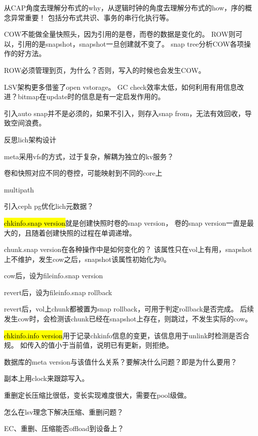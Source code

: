 从CAP角度去理解分布式的why，从逻辑时钟的角度去理解分布式的how，序的概念异常重要！
包括分布式共识、事务的串行化执行等。

\hrulefill

COW不能做全量快照头，因为引用的是卷，而卷的数据是变化的。
ROW则可以，引用的是snapshot，snapshot一旦创建就不变了。
snap tree分析COW各项操作的好方法。

ROW必须管理到页，为什么？否则，写入的时候也会发生COW。

LSV架构更多借鉴了open vstorage。
GC check效率太低，如何利用有用信息改进？bitmap在update时的信息是有一定启发作用的。

引入auto snap并不是必须的，如果不引入，则存入snap from，无法有效回收，导致空间浪费。

\hrulefill

反思lich架构设计
\begin{enumbox}
\item meta采用vfs的方式，过于复杂，解耦为独立的kv服务？
\item 卷和快照对应不同的卷控，可能映射到不同的core上
\item multipath
\item 引入ceph pg优化lich元数据？
\end{enumbox}

\hrulefill

\hl{chkinfo.snap version}就是创建快照时卷的snap version，
卷的snap version一直是最大的，且随着创建快照的过程在单调递增。

chunk.snap version在各种操作中是如何变化的？
该属性只在vol上有用，snapshot上不维护，发生cow之后，snapshot该属性初始化为0。
\begin{enumbox}
\item cow后，设为fileinfo.snap version
\item revert后，设为fileinfo.snap rollback
\end{enumbox}

revert后，vol上chunk都被置为snap rollback，可用于判定rollback是否完成。
后续发生cow时，会检测该chunk已经在snapshot上存在，则跳过，不发生实际的cow。

\hl{chkinfo.info version}用于记录chkinfo信息的变更，该信息用于unlink时检测是否合规。
如传入的值小于当前值，说明已有更新，则拒绝。

数据库的meta version与该值什么关系？要解决什么问题？即是为什么要用？

副本上用clock来跟踪写入。

\hrulefill

重删定长压缩比很低，变长实现难度很大，需要在pool级做。

怎么在lsv理念下解决压缩、重删问题？

EC、重删、压缩能否offload到设备上？
